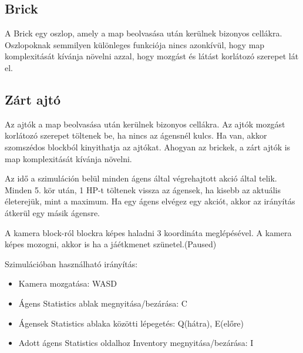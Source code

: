 
\label{object}

\subsection{Brick}

\label{brick}

A Brick egy oszlop, amely a map beolvasása után kerülnek bizonyos cellákra.
Oszlopoknak semmilyen különleges funkciója nincs azonkívül, hogy map komplexitását kívánja növelni azzal,
hogy mozgást és látást korlátozó szerepet lát el.

\subsection{Zárt ajtó}

Az ajtók a map beolvasása után kerülnek bizonyos cellákra.
Az ajtók mozgást korlátozó szerepet töltenek be, ha nincs az ágensnél kulcs. Ha van, akkor szomszédos blockból kinyithatja az ajtókat.
Ahogyan az brickek, a zárt ajtók is map komplexitását kívánja növelni.


Az idő a szimuláción belül minden ágens által végrehajtott akció által telik.
Minden 5. kör után, 1 HP-t töltenek vissza az ágensek, ha kisebb az aktuális életerejük, mint a maximum.
Ha egy ágens elvégez egy akciót, akkor az irányítás átkerül egy másik ágensre.


A kamera block-ról blockra képes haladni 3 koordináta meglépésével.
A kamera képes mozogni, akkor is ha a jáétkmenet szünetel.(Paused)


Szimulációban használható irányítás:

\begin{itemize}
    \item Kamera mozgatása: WASD
    \item Ágens Statistics ablak megnyitása/bezárása: C
    \item Ágensek Statistics ablaka közötti lépegetés: Q(hátra), E(előre)
    \item Adott ágens Statistics oldalhoz Inventory megnyitása/bezárása: I
\end{itemize}



